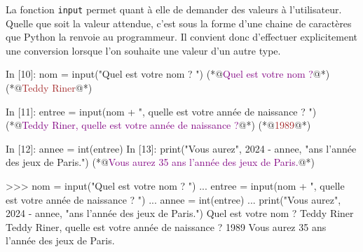 \documentclass{magnolia}
\begin{document}
%
%
%
%

La fonction \verb_input_ permet quant à elle de demander des valeurs à l'utilisateur.
Quelle que soit la valeur attendue, c'est sous la forme d'une chaine de caractères que
Python la renvoie au programmeur. Il convient donc d'effectuer explicitement une
conversion lorsque l'on souhaite une valeur d'un autre type.

\begin{francois}
\begin{pythoncode}
In [10]: nom = input("Quel est votre nom ? ")
(*@\textcolor{purple}{Quel est votre nom ?}@*) (*@\textcolor{brown}{Teddy Riner}@*)

In [11]: entree = input(nom + ", quelle est votre année de naissance ? ")
(*@\textcolor{purple}{Teddy Riner, quelle est votre année de naissance ?}@*) (*@\textcolor{brown}{1989}@*)

In [12]: annee = int(entree)
In [13]: print("Vous aurez", 2024 - annee, "ans l'année des jeux de Paris.")
(*@\textcolor{purple}{Vous aurez 35 ans l'année des jeux de Paris.}@*)
\end{pythoncode}
\end{francois}
\begin{victor}
\begin{pythoncode}
>>> nom = input("Quel est votre nom ? ")
... entree = input(nom + ", quelle est votre année de naissance ? ")
... annee = int(entree)
... print("Vous aurez", 2024 - annee, "ans l'année des jeux de Paris.")
Quel est votre nom ? Teddy Riner
Teddy Riner, quelle est votre année de naissance ? 1989
Vous aurez 35 ans l'année des jeux de Paris.
\end{pythoncode}
\end{victor}
\end{document}
